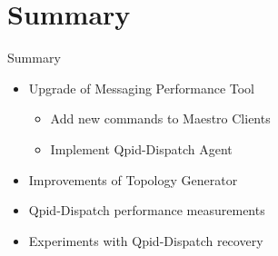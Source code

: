 \documentclass[hyperref={pdfpagelabels=false, unicode},pdf,slideColor,fyma,9pt]{beamer}
\begin{document}
		\section{Summary}
		\begin{frame}{Summary}
				\begin{itemize}
						\item Upgrade of Messaging Performance Tool
						\begin{itemize}
							\item Add new commands to Maestro Clients
							\item Implement Qpid-Dispatch Agent
						\end{itemize}
						\item Improvements of Topology Generator
						\item Qpid-Dispatch performance measurements
						\item Experiments with Qpid-Dispatch recovery
				\end{itemize}
		\end{frame}
\end{document}
